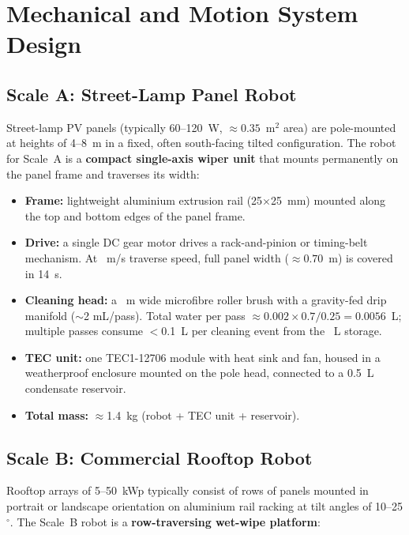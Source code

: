\documentclass[12pt,a4paper]{report}   %
\begin{document}
\chapter{Mechanical and Motion System Design}

\section{Scale A: Street-Lamp Panel Robot}

Street-lamp PV panels (typically 60--120~W, ${\approx}0.35$~m$^2$ area) are pole-mounted at
heights of 4--8~m in a fixed, often south-facing tilted configuration. The robot for Scale~A is
a \textbf{compact single-axis wiper unit} that mounts permanently on the panel frame and traverses
its width:

\begin{itemize}[leftmargin=*]
  \item \textbf{Frame:} lightweight aluminium extrusion rail (25$\times$25~mm) mounted along the
  top and bottom edges of the panel frame.
  \item \textbf{Drive:} a single DC gear motor drives a rack-and-pinion or timing-belt mechanism.
  At \RobotSpeed~m/s traverse speed, full panel width (${\approx}0.70$~m) is covered in 14~s.
  \item \textbf{Cleaning head:} a \BrushWidth~m wide microfibre roller brush with a gravity-fed
  drip manifold (${\sim}$2 mL/pass). Total water per pass $\approx 0.002 \times 0.7 / 0.25 = 0.0056$~L;
  multiple passes consume $<$0.1~L per cleaning event from the \ScaleAWaterDay~L storage.
  \item \textbf{TEC unit:} one TEC1-12706 module with heat sink and fan, housed in a weatherproof
  enclosure mounted on the pole head, connected to a 0.5~L condensate reservoir.
  \item \textbf{Total mass:} ${\approx}$1.4~kg (robot + TEC unit + reservoir).
\end{itemize}

\section{Scale B: Commercial Rooftop Robot}

Rooftop arrays of 5--50~kWp typically consist of rows of panels mounted in portrait or landscape
orientation on aluminium rail racking at tilt angles of 10--25$^\circ$. The Scale~B robot is a
\textbf{row-traversing wet-wipe platform}:
\end{document}
